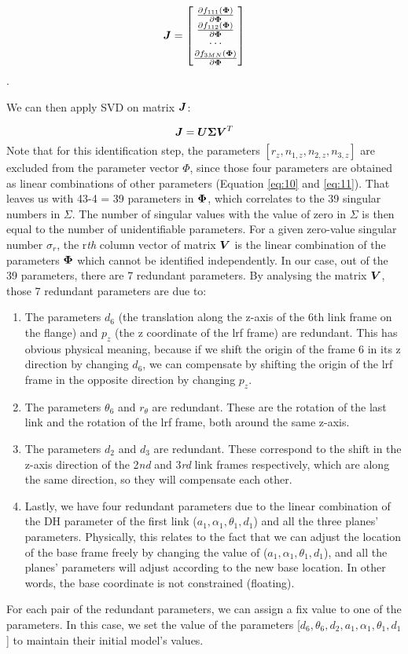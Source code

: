 \renewcommand\arraystretch{1.5}
\begin{equation}
\vb*{J} = \begin{bmatrix}
 \frac{\partial f_{111}(\vb*{\Phi})}{\partial\vb*{\Phi}}\\
 \frac{\partial f_{112}(\vb*{\Phi})}{\partial\vb*{\Phi}}\\
 \cdots \\
 \frac{\partial f_{3MN}(\vb*{\Phi})}{\partial\vb*{\Phi}}\\
	\end{bmatrix}
\end{equation}. 

We can then apply SVD on matrix $\vb*{J}$:

\begin{equation}
 \vb*{J} = \vb*{U}\vb*{\Sigma}\vb*{V}^T
\end{equation}
Note that for this identification step, the parameters $[r_z, n_{1,z}, n_{2,z}, n_{3,z}]$ are excluded from the parameter vector $\Phi$, since those four parameters are obtained as linear combinations of other parameters (Equation \eqref{eq:10} and \eqref{eq:11}). That leaves us with 43-4 = 39 parameters in $\vb*{\Phi}$, which correlates to the 39 singular numbers in $\Sigma$. The number of singular values with the value of zero in $\Sigma$ is then equal to the number of unidentifiable parameters. For a given zero-value singular number $\sigma_r$, the r\textit{th} column vector of matrix $\vb*{V}$ is the linear combination of the parameters $\vb*{\Phi}$ which cannot be identified independently. 
In our case, out of the 39 parameters, there are 7 redundant parameters. By analysing the matrix $\vb*{V}$, those 7 redundant parameters are due to:
\begin{enumerate}
\item The parameters $d_6$ (the translation along the z-axis of the 6th link frame on the flange) and $p_z$ (the z coordinate of the \ac{lrf} frame) are redundant. This has obvious physical meaning, because if we shift the origin of the frame 6 in its z direction by changing $d_6$, we can compensate by shifting the origin of the \ac{lrf} frame in the opposite direction by changing $p_z$.
\item The parameters $\theta_6$ and $r_\theta$ are redundant. These are the rotation of the last link and the rotation of the \ac{lrf} frame, both around the same z-axis. 
\item The parameters $d_2$ and $d_3$ are redundant. These correspond to the shift in the z-axis direction of the 2\textit{nd} and 3\textit{rd} link frames respectively, which are along the same direction, so they will compensate each other. 
\item Lastly, we have four redundant parameters due to the linear combination of the DH parameter of the first link ($a_1, \alpha_1, \theta_1, d_1$) and all the three planes' parameters. Physically, this relates to the fact that we can adjust the location of the base frame freely by changing the value of ($a_1, \alpha_1, \theta_1, d_1$), and all the planes' parameters will adjust according to the new base location. In other words, the base coordinate is not constrained (floating). 
\end{enumerate}

For each pair of the redundant parameters, we can assign a fix value to one of the parameters. In this case, we set the value of the parameters [$d_6, \theta_6, d_2, a_1, \alpha_1, \theta_1, d_1$] to maintain their initial model's values. 
